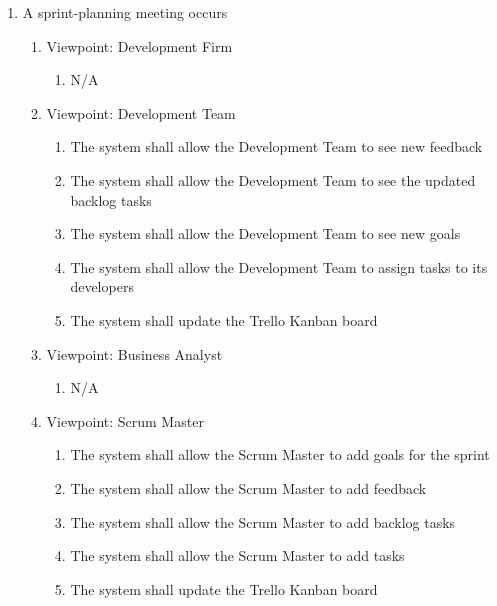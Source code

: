 \documentclass[12pt, titlepage]{article}
\begin{document}
\begin{enumerate}[{BE}1.]
	\item A sprint-planning meeting occurs %
	\begin{enumerate}[{VP}1.] 
	    \item Viewpoint: Development Firm
	        \begin{enumerate}
	            \item[] N/A
	        \end{enumerate}
	    \item Viewpoint: Development Team
	        \begin{enumerate}
	            \item The system shall allow the Development Team to see new feedback
	            \item The system shall allow the Development Team to see the updated backlog tasks
	            \item The system shall allow the Development Team to see new goals
	            \item The system shall allow the Development Team to assign tasks to its developers
	            \item The system shall update the Trello Kanban board
	        \end{enumerate}
		\item Viewpoint: Business Analyst
			\begin{enumerate}
			    \item[] N/A
			\end{enumerate}
		\item Viewpoint: Scrum Master
			\begin{enumerate}
	            \item The system shall allow the Scrum Master to add goals for the sprint
	            \item The system shall allow the Scrum Master to add feedback
	            \item The system shall allow the Scrum Master to add backlog tasks
	            \item The system shall allow the Scrum Master to add tasks
	            \item The system shall update the Trello Kanban board
			\end{enumerate}
	\end{enumerate}


\end{enumerate}
\end{document}
